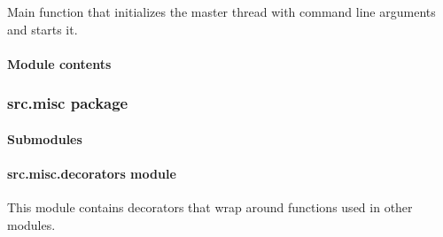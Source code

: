 \documentclass[letterpaper,10pt,english]{sphinxmanual}
\begin{document}

\begin{fulllineitems}
\label{src.mapping:src.mapping.mapthreading.main}
Main function that initializes the master thread with command line arguments and starts it.

\end{fulllineitems}



\paragraph{Module contents}
\label{src.mapping:module-src.mapping}\label{src.mapping:module-contents}

\subsubsection{src.misc package}
\label{src.misc:src-misc-package}\label{src.misc::doc}

\paragraph{Submodules}
\label{src.misc:submodules}

\paragraph{src.misc.decorators module}
\label{src.misc:module-src.misc.decorators}\label{src.misc:src-misc-decorators-module}
This module contains decorators that wrap around functions used in other modules.
\end{document}
